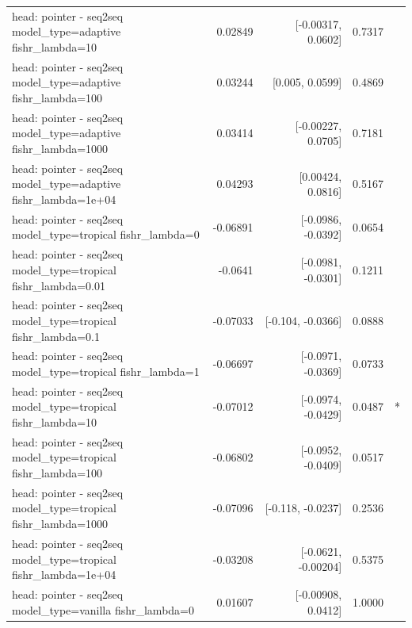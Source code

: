 \documentclass[10pt]{article}
\makeatletter
\newcommand{\stackcell}[1]{\begin{tabular}[t]{@{}l@{}}#1\end{tabular}}
\makeatother
\begin{document}
{\begin{longtable}{lrrrl}
\stackcell{head: pointer - seq2seq\\\footnotesize model\_type=adaptive fishr\_lambda=10 } & 0.02849 & [-0.00317, 0.0602] & 0.7317 & \\
\stackcell{head: pointer - seq2seq\\\footnotesize model\_type=adaptive fishr\_lambda=100 } & 0.03244 & [0.005, 0.0599] & 0.4869 & \\
\stackcell{head: pointer - seq2seq\\\footnotesize model\_type=adaptive fishr\_lambda=1000 } & 0.03414 & [-0.00227, 0.0705] & 0.7181 & \\
\stackcell{head: pointer - seq2seq\\\footnotesize model\_type=adaptive fishr\_lambda=1e+04 } & 0.04293 & [0.00424, 0.0816] & 0.5167 & \\
\stackcell{head: pointer - seq2seq\\\footnotesize model\_type=tropical fishr\_lambda=0 } & -0.06891 & [-0.0986, -0.0392] & 0.0654 & \\
\stackcell{head: pointer - seq2seq\\\footnotesize model\_type=tropical fishr\_lambda=0.01 } & -0.0641 & [-0.0981, -0.0301] & 0.1211 & \\
\stackcell{head: pointer - seq2seq\\\footnotesize model\_type=tropical fishr\_lambda=0.1 } & -0.07033 & [-0.104, -0.0366] & 0.0888 & \\
\stackcell{head: pointer - seq2seq\\\footnotesize model\_type=tropical fishr\_lambda=1 } & -0.06697 & [-0.0971, -0.0369] & 0.0733 & \\
\stackcell{head: pointer - seq2seq\\\footnotesize model\_type=tropical fishr\_lambda=10 } & -0.07012 & [-0.0974, -0.0429] & 0.0487 & *\\
\stackcell{head: pointer - seq2seq\\\footnotesize model\_type=tropical fishr\_lambda=100 } & -0.06802 & [-0.0952, -0.0409] & 0.0517 & \\
\stackcell{head: pointer - seq2seq\\\footnotesize model\_type=tropical fishr\_lambda=1000 } & -0.07096 & [-0.118, -0.0237] & 0.2536 & \\
\stackcell{head: pointer - seq2seq\\\footnotesize model\_type=tropical fishr\_lambda=1e+04 } & -0.03208 & [-0.0621, -0.00204] & 0.5375 & \\
\stackcell{head: pointer - seq2seq\\\footnotesize model\_type=vanilla fishr\_lambda=0 } & 0.01607 & [-0.00908, 0.0412] & 1.0000 & \\

\end{longtable}}
\end{document}
